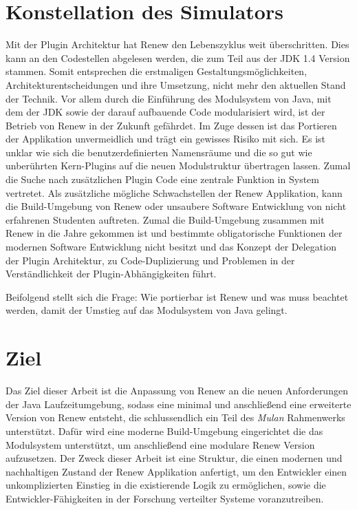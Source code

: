 \section{Konstellation des Simulators} \label{sec:KdS}

	Mit der Plugin Architektur hat Renew den Lebenszyklus weit überschritten. Dies kann an den Codestellen abgelesen werden, die zum Teil aus der JDK 1.4 Version stammen. Somit entsprechen die erstmaligen Gestaltungsmöglichkeiten, Architekturentscheidungen und ihre Umsetzung, nicht mehr den aktuellen Stand der Technik. Vor allem durch die Einführung des Modulsystem von Java, mit dem der JDK sowie der darauf aufbauende Code modularisiert wird, ist der Betrieb von Renew in der Zukunft gefährdet. Im Zuge dessen ist das Portieren der Applikation unvermeidlich und trägt ein gewisses Risiko mit sich. Es ist unklar wie sich die benutzerdefinierten Namensräume und die so gut wie unberührten Kern-Plugins auf die neuen Modulstruktur übertragen lassen. Zumal die Suche nach zusätzlichen Plugin Code eine zentrale Funktion in System vertretet.\newline
	Als zusätzliche mögliche Schwachstellen der Renew Applikation, kann die Build-Umgebung von Renew oder unsaubere Software Entwicklung von nicht erfahrenen Studenten auftreten. Zumal die Build-Umgebung zusammen mit Renew in die Jahre gekommen ist und bestimmte obligatorische Funktionen der modernen Software Entwicklung nicht besitzt und das Konzept der Delegation der Plugin Architektur, zu Code-Duplizierung und Problemen in der Verständlichkeit der Plugin-Abhängigkeiten führt.\bigbreak

	Beifolgend stellt sich die Frage: Wie portierbar ist Renew und was muss beachtet werden, damit der Umstieg auf das Modulsystem von Java gelingt.

\section{Ziel} \label{sec:Z}

	Das Ziel dieser Arbeit ist die Anpassung von Renew an die neuen Anforderungen der Java Laufzeitumgebung, sodass eine minimal und anschließend eine erweiterte Version von Renew entsteht, die schlussendlich ein Teil des \textit{Mulan} Rahmenwerks unterstützt. Dafür wird eine moderne Build-Umgebung eingerichtet die das Modulsystem unterstützt, um anschließend eine modulare Renew Version aufzusetzen. 
	Der Zweck dieser Arbeit ist eine Struktur, die einen modernen und nachhaltigen Zustand der Renew Applikation anfertigt, um den Entwickler einen unkomplizierten Einstieg in die existierende Logik zu ermöglichen, sowie die Entwickler-Fähigkeiten in der Forschung verteilter Systeme voranzutreiben.\bigbreak

